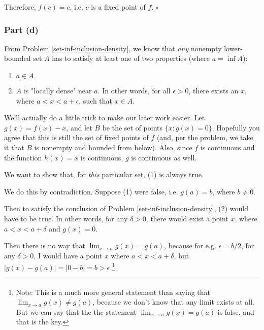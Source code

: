 
Therefore, $f(c) = c$, i.e. $c$ is a fixed point of $f$. $\square$

\subsubsection{Part (d)}

From Problem \ref{set-inf-inclusion-density}, we know that \textit{any} nonempty lower-bounded set $A$ has to satisfy at least one of two properties (where $a = \inf A$):
 
\begin{enumerate}[(1)]
\item $a \in A$
\item $A$ is "locally dense" near $a$. In other words, for all $\epsilon > 0$, there exists an $x$, where $a < x < a + \epsilon$, such that $x \in A$. 
\end{enumerate}

We'll actually do a little trick to make our later work easier. Let $g(x) = f(x) - x$, and let $B$ be the set of points $\{x : g(x) = 0\}$. Hopefully you agree that this is still the set of fixed points of $f$ (and, per the problem, we take it that $B$ is nonempty and bounded from below). Also, since $f$ is continuous and the function $h(x) = x$ is continuous, $g$ is continuous as well. 

We want to show that, for \textit{this} particular set, (1) is always true. 

We do this by contradiction. Suppose (1) were false, i.e. $g(a) = b$, where $b \neq 0$.

Then to satisfy the conclusion of Problem \ref{set-inf-inclusion-density}, (2) would have to be true. In other words, for any $\delta > 0$, there would exist a point $x$, where $a < x < a + \delta$ and $g(x) = 0$. 

Then there is no way that $\lim_{x \rightarrow a} g(x) = g(a)$, because for e.g. $\epsilon = b/2$, for any $\delta > 0$, I would have a point $x$ where $a < x < a + \delta$, but $|g(x) - g(a)| = |0 - b| = b > \epsilon$.\footnote{Note: This is a much more general statement than saying that $\lim_{x \rightarrow a} g(x) \neq g(a)$, because we don't know that any limit exists at all. But we can say that the the statement $\lim_{x \rightarrow a} g(x) = g(a)$ is false, and that is the key.}

